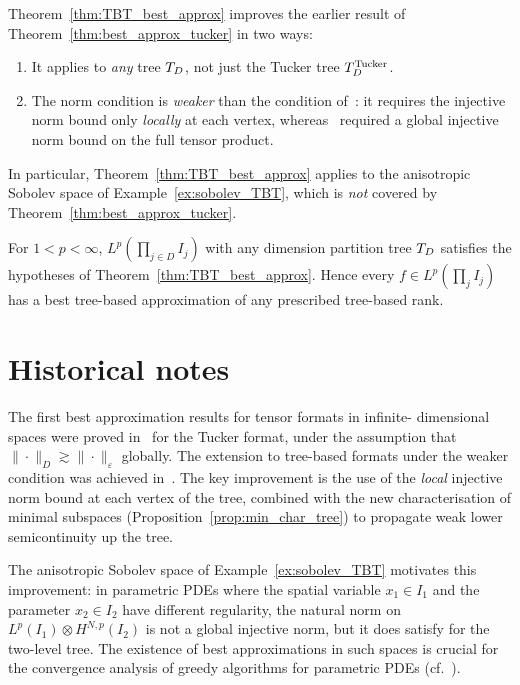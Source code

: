 \begin{remark}
\label{rem:TBT_improvement}
Theorem~\ref{thm:TBT_best_approx} improves the earlier result of
Theorem~\ref{thm:best_approx_tucker} in two ways:
\begin{enumerate}
\item It applies to \emph{any} tree $T_D$, not just the Tucker
    tree $T_D^{\mathrm{Tucker}}$.
\item The norm condition \condINJ[$T_D$] is \emph{weaker} than the
    condition of~\cite{FH2012}: it requires the injective norm bound
    only \emph{locally} at each vertex, whereas~\cite{FH2012} required
    a global injective norm bound on the full tensor product.
\end{enumerate}
In particular, Theorem~\ref{thm:TBT_best_approx} applies to the
anisotropic Sobolev space of Example~\ref{ex:sobolev_TBT}, which
is \emph{not} covered by Theorem~\ref{thm:best_approx_tucker}.
\end{remark}

\begin{corollary}
\label{cor:TBT_best_approx_Lp}
For $1 < p < \infty$, $L^p(\prod_{j \in D} I_j)$ with any dimension
partition tree $T_D$ satisfies the hypotheses of
Theorem~\ref{thm:TBT_best_approx}. Hence every $f \in L^p(\prod_j I_j)$
has a best tree-based approximation of any prescribed tree-based rank.
\end{corollary}

\section{Historical notes}
\label{sec:topTBT:history}

The first best approximation results for tensor formats in infinite-
dimensional spaces were proved in~\cite{FH2012} for the Tucker format,
under the assumption that $\|\cdot\|_D \gtrsim \|\cdot\|_\varepsilon$
globally. The extension to tree-based formats under the weaker condition
\condINJ[$T_D$] was achieved in~\cite{FHN2021}. The key improvement is
the use of the \emph{local} injective norm bound at each vertex of the
tree, combined with the new characterisation of minimal subspaces
(Proposition~\ref{prop:min_char_tree}) to propagate weak lower
semicontinuity up the tree.

The anisotropic Sobolev space of Example~\ref{ex:sobolev_TBT}
motivates this improvement: in parametric PDEs where the spatial
variable $x_1 \in I_1$ and the parameter $x_2 \in I_2$ have
different regularity, the natural norm on $L^p(I_1) \otimes H^{N,p}(I_2)$
is not a global injective norm, but it does satisfy
\condINJ[$T_D$] for the two-level tree. The existence of best
approximations in such spaces is crucial for the convergence analysis
of greedy algorithms for parametric PDEs
(cf.~\cite{Nouy2017}).

